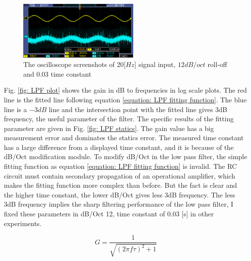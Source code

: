 \documentclass{article}
\begin{document}
 \begin{figure}[H]
  \centering
  \includegraphics[width = 6cm] {../raw_data/TEK00484.PNG}
  \caption{The oscilloscope screenshots of 20[$Hz$] signal input, $12 dB/oct$ roll-off and 0.03 time constant}
  \label{fig: raw_plot of LPF}
 \end{figure}

 Fig. \ref{fig: LPF plot} shows the gain in dB to frequencies in log scale plots.
 The red line is the fitted line following equation \ref{equation: LPF fitting function}.
 The blue line is a $-3dB$ line and the intersection point with the fitted line gives 3dB frequency, the useful parameter of the filter.
 The specific results of the fitting parameter are given in Fig. \ref{fig: LPF statics}.
 The gain value has a big measurement error and dominates the statics error.
 The measured time constant has a large difference from a displayed time constant, and it is because of the dB/Oct modification module.
 To modify dB/Oct in the low pass filter, the simple fitting function as equation \ref{equation: LPF fitting function} is invalid.
 The RC circuit must contain secondary propagation of an operational amplifier, which makes the fitting function more complex than before.
 But the fact is clear and the higher time constant, the lower dB/Oct gives less 3dB frequency.
 The less 3dB frequency implies the sharp filtering performance of the low pass filter, I fixed these parameters in dB/Oct 12, time constant of 0.03 [s] in other experiments.

 \begin{equation}
  G = \frac{1}{\sqrt{(2 \pi f \tau)^2 +1}}
  \label{equation: LPF fitting function}
 \end{equation}
\end{document}
